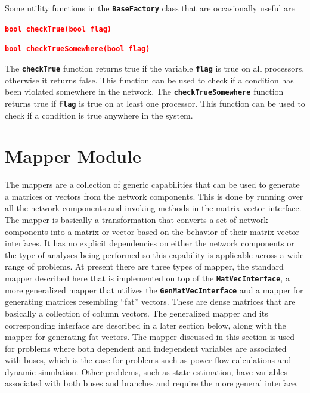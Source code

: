\documentclass[12pt]{report} %
\begin{document}
Some utility functions in the \texttt{\textbf{BaseFactory}} class that are occasionally useful are

\textcolor{red}{\texttt{\textbf{bool checkTrue(bool flag)}}}

\textcolor{red}{\texttt{\textbf{bool checkTrueSomewhere(bool flag)}}}

The \texttt{\textbf{checkTrue}} function returns true if the variable \texttt{\textbf{flag}} is true on all processors, otherwise it returns false. This function can be used to check if a condition has been violated somewhere in the network. The \texttt{\textbf{checkTrueSomewhere}} function returns true if \texttt{\textbf{flag}} is true on at least one processor. This function can be used to check if a condition is true anywhere in the system.

\section{Mapper Module}

The mappers are a collection of generic capabilities that can be used to generate a matrices or vectors from the network components. This is done by running over all the network components and invoking methods in the matrix-vector interface. The mapper is basically a transformation that converts a set of network components into a matrix or vector based on the behavior of their matrix-vector interfaces. It has no explicit dependencies on either the network components or the type of analyses being performed so this capability is applicable across a wide range of problems. At present there are three types of mapper, the standard mapper described here that is implemented on top of the \texttt{\textbf{MatVecInterface}}, a more generalized mapper that utilizes the \texttt{\textbf{GenMatVecInterface}} and a mapper for generating matrices resembling ``fat'' vectors. These are dense matrices that are basically a collection of column vectors. The generalized mapper and its corresponding interface are described in a later section below, along with the mapper for generating fat vectors. The mapper discussed in this section is used for problems where both dependent and independent variables are associated with buses, which is the case for problems such as power flow calculations and dynamic simulation. Other problems, such as state estimation, have variables associated with both buses and branches and require the more general interface.
\end{document}
